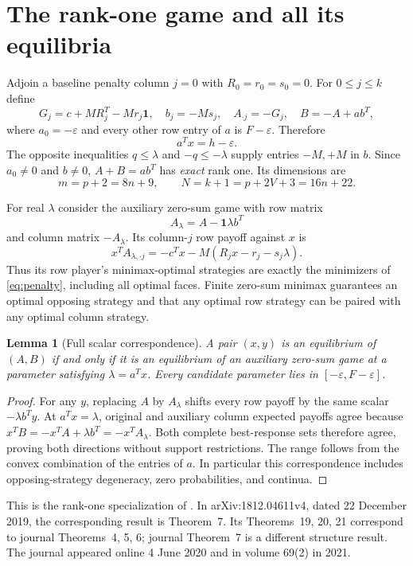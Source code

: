 \documentclass[11pt]{article}
\newtheorem{lemma}[theorem]{Lemma}
\theoremstyle{remark}\newtheorem{remark}[theorem]{Remark}
\newcommand{\one}{\mathbf1}
\newcommand{\eps}{\varepsilon}
\begin{document}
\section{The rank-one game and all its equilibria}
Adjoin a baseline penalty column $j=0$ with $R_0=r_0=s_0=0$. For $0\le j\le k$ define
\begin{equation}\label{eq:game}
 G_j=c+MR_j^T-Mr_j\one,\quad b_j=-Ms_j,\quad
 A_{\cdot j}=-G_j,\quad B=-A+ab^T,
\end{equation}
where $a_0=-\eps$ and every other row entry of $a$ is $F-\eps$. Therefore
\[
 a^Tx=h-\eps.
\]
The opposite inequalities $q\le\lambda$ and $-q\le-\lambda$ supply entries $-M,+M$ in $b$. Since $a_0\ne0$ and $b\ne0$, $A+B=ab^T$ has \emph{exact} rank one. Its dimensions are
\[
 m=p+2=8n+9,\qquad N=k+1=p+2V+3=16n+22.
\]

For real $\lambda$ consider the auxiliary zero-sum game with row matrix
\[
 A_\lambda=A-\one\lambda b^T
\]
and column matrix $-A_\lambda$. Its column-$j$ row payoff against $x$ is
\[
 x^TA_{\lambda,\cdot j}=-c^Tx-M(R_jx-r_j-s_j\lambda).
\]
Thus its row player's minimax-optimal strategies are exactly the minimizers of \eqref{eq:penalty}, including all optimal faces. Finite zero-sum minimax guarantees an optimal opposing strategy and that any optimal row strategy can be paired with any optimal column strategy.

\begin{lemma}[Full scalar correspondence]\label{lem:correspondence}
A pair $(x,y)$ is an equilibrium of $(A,B)$ if and only if it is an equilibrium of an auxiliary zero-sum game at a parameter satisfying $\lambda=a^Tx$. Every candidate parameter lies in $[-\eps,F-\eps]$.
\end{lemma}
\begin{proof}
For any $y$, replacing $A$ by $A_\lambda$ shifts every row payoff by the same scalar $-\lambda b^Ty$. At $a^Tx=\lambda$, original and auxiliary column expected payoffs agree because $x^TB=-x^TA+\lambda b^T=-x^TA_\lambda$. Both complete best-response sets therefore agree, proving both directions without support restrictions. The range follows from the convex combination of the entries of $a$. In particular this correspondence includes opposing-strategy degeneracy, zero probabilities, and continua.
\end{proof}
This is the rank-one specialization of \cite[Theorem~1]{adsul}. In arXiv:1812.04611v4, dated 22 December 2019, the corresponding result is Theorem~7. Its Theorems~19, 20, 21 correspond to journal Theorems~4, 5, 6; journal Theorem~7 is a different structure result. The journal appeared online 4 June 2020 and in volume 69(2) in 2021.
\end{document}
